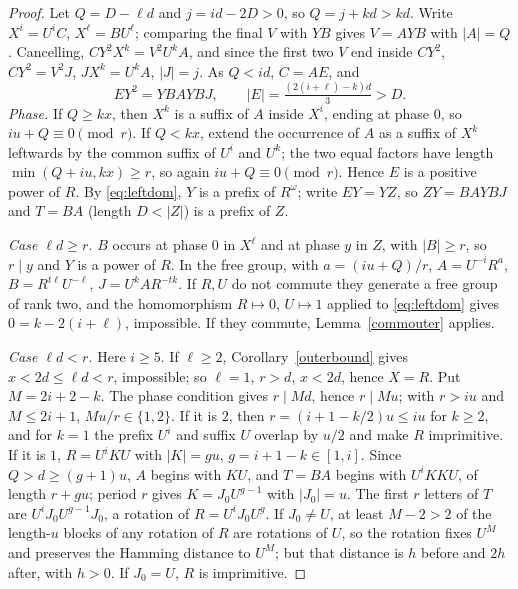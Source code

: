\begin{proof}
Let \(Q=D-\ell d\) and \(j=id-2D>0\), so \(Q=j+kd>kd\). Write \(X^i=U^iC\), \(X^\ell=BU^\ell\); comparing the final \(V\) with \(YB\) gives \(V=AYB\) with \(|A|=Q\). Cancelling, \(CY^2X^k=V^2U^kA\), and since the first two \(V\) end inside \(CY^2\), \(CY^2=V^2J\), \(JX^k=U^kA\), \(|J|=j\). As \(Q<id\), \(C=AE\), and
\begin{equation}\label{eq:leftdom}
EY^2=YBAYBJ,\qquad |E|=\tfrac{(2(i+\ell)-k)d}{3}>D.
\end{equation}
\emph{Phase.} If \(Q\ge kx\), then \(X^k\) is a suffix of \(A\) inside \(X^i\), ending at phase \(0\), so \(iu+Q\equiv0\pmod r\). If \(Q<kx\), extend the occurrence of \(A\) as a suffix of \(X^k\) leftwards by the common suffix of \(U^i\) and \(U^k\); the two equal factors have length \(\min(Q+iu,kx)\ge r\), so again \(iu+Q\equiv0\pmod r\). Hence \(E\) is a positive power of \(R\). By \eqref{eq:leftdom}, \(Y\) is a prefix of \(R^\omega\); write \(EY=YZ\), so \(ZY=BAYBJ\) and \(T=BA\) (length \(D<|Z|\)) is a prefix of \(Z\).

\emph{Case \(\ell d\ge r\).} \(B\) occurs at phase \(0\) in \(X^\ell\) and at phase \(y\) in \(Z\), with \(|B|\ge r\), so \(r\mid y\) and \(Y\) is a power of \(R\). In the free group, with \(a=(iu+Q)/r\), \(A=U^{-i}R^a\), \(B=R^{t\ell}U^{-\ell}\), \(J=U^kAR^{-tk}\). If \(R,U\) do not commute they generate a free group of rank two, and the homomorphism \(R\mapsto0\), \(U\mapsto1\) applied to \eqref{eq:leftdom} gives \(0=k-2(i+\ell)\), impossible. If they commute, Lemma~\ref{commouter} applies.

\emph{Case \(\ell d<r\).} Here \(i\ge5\). If \(\ell\ge2\), Corollary~\ref{outerbound} gives \(x<2d\le\ell d<r\), impossible; so \(\ell=1\), \(r>d\), \(x<2d\), hence \(X=R\). Put \(M=2i+2-k\). The phase condition gives \(r\mid Md\), hence \(r\mid Mu\); with \(r>iu\) and \(M\le2i+1\), \(Mu/r\in\{1,2\}\). If it is \(2\), then \(r=(i+1-k/2)u\le iu\) for \(k\ge2\), and for \(k=1\) the prefix \(U^i\) and suffix \(U\) overlap by \(u/2\) and make \(R\) imprimitive. If it is \(1\), \(R=U^iKU\) with \(|K|=gu\), \(g=i+1-k\in[1,i]\). Since \(Q>d\ge(g+1)u\), \(A\) begins with \(KU\), and \(T=BA\) begins with \(U^iKKU\), of length \(r+gu\); period \(r\) gives \(K=J_0U^{g-1}\) with \(|J_0|=u\). The first \(r\) letters of \(T\) are \(U^iJ_0U^{g-1}J_0\), a rotation of \(R=U^iJ_0U^g\). If \(J_0\ne U\), at least \(M-2>2\) of the length-\(u\) blocks of any rotation of \(R\) are rotations of \(U\), so the rotation fixes \(U^M\) and preserves the Hamming distance to \(U^M\); but that distance is \(h\) before and \(2h\) after, with \(h>0\). If \(J_0=U\), \(R\) is imprimitive.
\end{proof}

